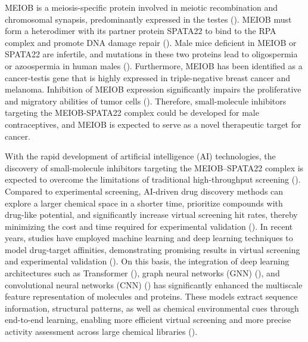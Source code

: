 \documentclass[unnumsec,webpdf,contemporary,large]{oup-authoring-template}%
\theoremstyle{thmstyleone}%
\theoremstyle{thmstyletwo}%
\theoremstyle{thmstylethree}%
\begin{document}
MEIOB is a meiosis-specific protein involved in meiotic recombination and chromosomal synapsis, predominantly expressed in the testes (\citealt{6,7}). MEIOB must form a heterodimer with its partner protein SPATA22 to bind to the RPA complex and promote DNA damage repair (\citealt{8,9,10,11}). Male mice deficient in MEIOB or SPATA22 are infertile, and mutations in these two proteins lead to oligospermia or azoospermia in human males (\citealt{12,13,14,15,16,17}). Furthermore, MEIOB has been identified as a cancer-testis gene that is highly expressed in triple-negative breast cancer and melanoma. Inhibition of MEIOB expression significantly impairs the proliferative and migratory abilities of tumor cells (\citealt{18,19,20}). Therefore, small-molecule inhibitors targeting the MEIOB-SPATA22 complex could be developed for male contraceptives, and MEIOB is expected to serve as a novel therapeutic target for cancer.

With the rapid development of artificial intelligence (AI) technologies, the discovery of small-molecule inhibitors targeting the MEIOB–SPATA22 complex is expected to overcome the limitations of traditional high-throughput screening (\citealt{21}). Compared to experimental screening, AI-driven drug discovery methods can explore a larger chemical space in a shorter time, prioritize compounds with drug-like potential, and significantly increase virtual screening hit rates, thereby minimizing the cost and time required for experimental validation (\citealt{22}). In recent years, studies have employed machine learning and deep learning techniques to model drug-target affinities, demonstrating promising results in virtual screening and experimental validation (\citealt{23,24,25,26,27}). On this basis, the integration of deep learning architectures such as Transformer (\citealt{28}), graph neural networks (GNN) (\citealt{29}), and convolutional neural networks (CNN) (\citealt{30}) has significantly enhanced the multiscale feature representation of molecules and proteins. These models extract sequence information, structural patterns, as well as chemical environmental cues through end-to-end learning, enabling more efficient virtual screening and more precise activity assessment across large chemical libraries (\citealt{31,32,33,34}).
\end{document}
